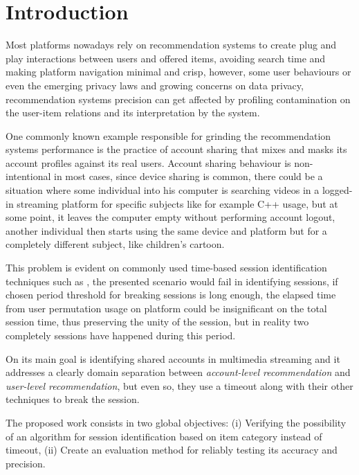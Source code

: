 \documentclass[ecp,tc,english]{iiufrgs}
\begin{document}
\tableofcontents %


\chapter{Introduction}
Most platforms nowadays rely on recommendation systems to create plug and play interactions between users and offered items, avoiding search time and making platform navigation minimal and crisp, however, some user behaviours or even the emerging privacy laws and growing concerns on data privacy, recommendation systems precision can get affected by profiling contamination on the user-item relations  and its interpretation by the system.

One commonly known example responsible for grinding the recommendation systems performance is the practice of account sharing that mixes and masks its account profiles against its real users. Account sharing behaviour is non-intentional in most cases, since device sharing is common, there could be a situation where some individual into his computer is searching videos in a logged-in streaming platform for specific subjects like for example C++ usage, but at some point, it leaves the computer empty without performing account logout, another individual then starts using the same device and platform but for a completely different subject, like children's cartoon.

This problem is evident on commonly used time-based session identification techniques such as \cite{halfaker2015}, the presented scenario would fail in identifying sessions, if chosen period threshold for breaking sessions is long enough, the elapsed time from user permutation usage on platform could be insignificant on the total session time, thus preserving the unity of the session, but in reality two completely sessions have happened during this period.

On \cite{jiang2018} its main goal is identifying shared accounts in multimedia streaming and it addresses a clearly domain separation between \textit{account-level recommendation} and \textit{user-level recommendation}, but even so, they use a timeout along with their other techniques to break the session.

The proposed work consists in two global objectives: (i) Verifying the possibility of an algorithm for session identification based on item category instead of timeout, 
(ii) Create an evaluation method for reliably testing its accuracy and precision.
\end{document}
